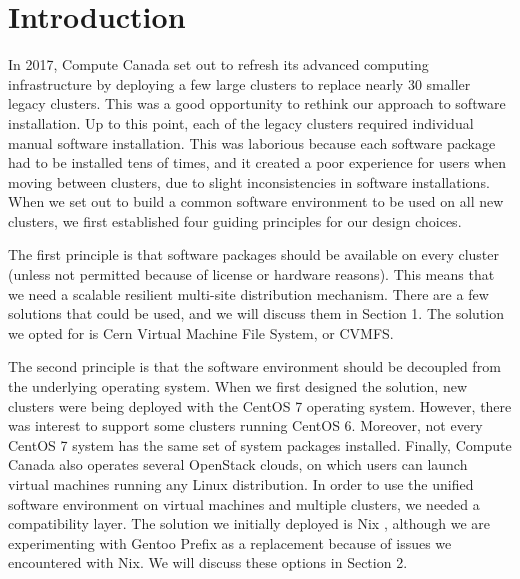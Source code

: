 \documentclass[sigconf]{acmart}
\begin{document}
%
\maketitle

\section{Introduction}
In 2017, Compute Canada set out to refresh its advanced computing infrastructure by deploying a few large clusters to replace nearly 30 smaller legacy clusters. This was a good opportunity to rethink our approach to software installation. Up to this point, each of the legacy clusters required individual manual software installation. This was laborious because each software package had to be installed tens of times, and it created a poor experience for users when moving between clusters, due to slight inconsistencies in software installations. When we set out to build a common software environment to be used on all new clusters, we first established four guiding principles for our design choices. 

The first principle is that software packages should be available on every cluster (unless not permitted because of license or hardware reasons). This means that we need a scalable resilient multi-site distribution mechanism. There are a few solutions that could be used, and we will discuss them in Section 1. The solution we opted for is Cern Virtual Machine File System, or CVMFS\cite{CVMFS}. 

The second principle is that the software environment should be decoupled from the underlying operating system. When we first designed the solution, new clusters were being deployed with the CentOS 7 operating system. However, there was interest to support some clusters running CentOS 6. Moreover, not every CentOS 7 system has the same set of system packages installed. Finally, Compute Canada also operates several OpenStack clouds, on which users can launch virtual machines running any Linux distribution. In order to use the unified software environment on virtual machines and multiple clusters, we needed a compatibility layer. The solution we initially deployed is Nix \cite{Nix}, although we are experimenting with Gentoo Prefix \cite{Gentoo} as a replacement because of issues we encountered with Nix. We will discuss these options in Section 2.
\end{document}
